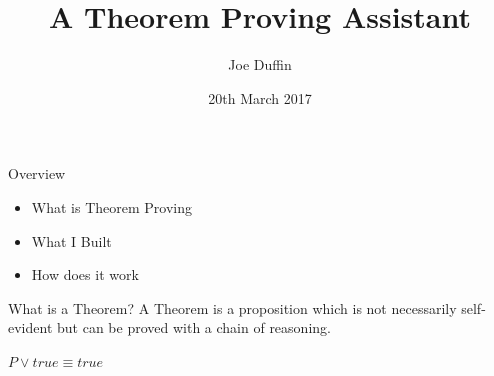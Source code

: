 \documentclass[11pt]{beamer}
\author{Joe Duffin}
\title{A Theorem Proving Assistant}
\institute{School of Computer Science \\University College Dublin}
\date{20th March 2017}
\begin{document}
\setlength{\abovedisplayskip}{0pt}
\setlength{\belowdisplayskip}{0pt}
\setlength{\abovedisplayshortskip}{0pt}
\setlength{\belowdisplayshortskip}{0pt}

\begin{frame}
\titlepage
\end{frame}


\begin{frame}{Overview}
\begin{itemize}
\setlength\itemsep{2em}
\item What is Theorem Proving
\item What I Built
\item How does it work
\end{itemize}
\end{frame}

\begin{frame}{What is a Theorem?}
A Theorem is a proposition which is not necessarily self-evident but can be proved with a chain of reasoning.\\
\vspace{1cm}
\begin{Theorem}
$P \vee true \equiv true$
\end{Theorem}
\end{frame}
\end{document}
